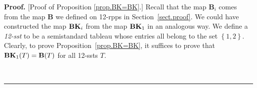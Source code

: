 \documentclass[numbers=enddot,12pt,final,onecolumn,notitlepage]{scrartcl}%
\theoremstyle{definition}
\newtheorem{exmp}[theo]{Example}
\newenvironment{example}[1][]
{\begin{exmp}[#1]\begin{leftbar}}
{\end{leftbar}\end{exmp}}
\newenvironment{proof}[1][Proof]{\noindent\textbf{#1.} }{\ \rule{0.5em}{0.5em}}
\begin{document}
\begin{proof}
[Proof of Proposition \ref{prop.BK=BK}.] 
Recall that the map $\mathbf{B}_i$ comes from the map $\mathbf{B}$ we defined on 12-rpps in Section~\ref{sect.proof}.
We could have constructed the map ${\mathbf{BK}}_i$ from the map ${\mathbf{BK}}_1$ in an analogous way.
We define a \textit{12-sst} to be a semistandard tableau whose entries all belong to the set $\left\{  1,2\right\}  $.
Clearly, to prove Proposition~\ref{prop.BK=BK}, it suffices to prove that ${\mathbf{BK}}_1(T) = \mathbf{B}(T)$ for all 12-ssts $T$.


\end{proof}
\end{document}
